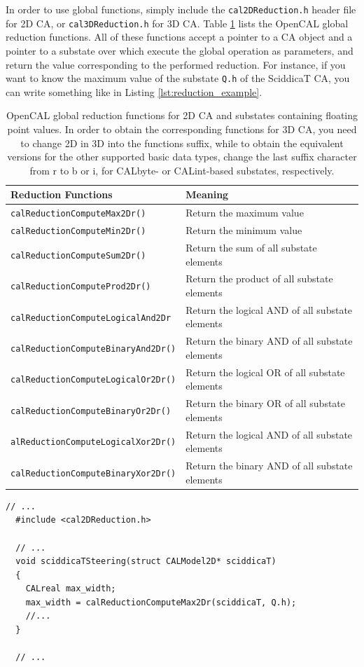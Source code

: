 In order to use global functions, simply include the
\verb'cal2DReduction.h' header file for 2D CA, or
\verb'cal3DReduction.h' for 3D CA. Table \ref{tab:reductions} lists
the OpenCAL global reduction functions. All of these functions
accept a pointer to a CA object and a pointer to a substate over
which execute the global operation as parameters, and return the value
corresponding to the performed reduction. For instance, if you want to
know the maximum value of the substate \verb'Q.h' of the SciddicaT CA,
you can write something like in Listing \ref{lst:reduction_example}.



\begin{table}
  \centering
  \footnotesize
  \begin{tabular}{l|l}
    \hline
    Reduction Functions & Meaning \\
    \hline
    \verb'calReductionComputeMax2Dr()'       & Return the maximum value\\
    \verb'calReductionComputeMin2Dr()'       & Return the minimum value\\
    \verb'calReductionComputeSum2Dr()'       & Return the sum of all substate elements\\
    \verb'calReductionComputeProd2Dr()'      & Return the product of all substate elements\\
    \verb'calReductionComputeLogicalAnd2Dr'  & Return the logical AND of all substate elements\\
    \verb'calReductionComputeBinaryAnd2Dr()' & Return the binary AND of all substate elements\\
    \verb'calReductionComputeLogicalOr2Dr()' & Return the logical OR of all substate elements\\
    \verb'calReductionComputeBinaryOr2Dr()'  & Return the binary OR of all substate elements\\
    \verb'alReductionComputeLogicalXor2Dr()' & Return the logical AND of all substate elements\\
    \verb'calReductionComputeBinaryXor2Dr()' & Return the binary AND of all substate elements\\
    \hline
  \end{tabular}
  \caption{OpenCAL global reduction functions for 2D CA and
    substates containing floating point values. In order to obtain the
    corresponding functions for 3D CA, you need to change 2D in 3D
    into the functions suffix, while to obtain the equivalent
    versions for the other supported basic data types, change the last
    suffix character from r to b or i, for CALbyte- or CALint-based
    substates, respectively.}
  \label{tab:reductions}
\end{table}


\begin{lstlisting}[float, label=lst:reduction_example, caption=An example of global reduction operation., numbers=none]
  // ...
  #include <cal2DReduction.h>

  // ...
  void sciddicaTSteering(struct CALModel2D* sciddicaT)
  {
    CALreal max_width;
    max_width = calReductionComputeMax2Dr(sciddicaT, Q.h);
    //...
  }

  // ...
\end{lstlisting}
